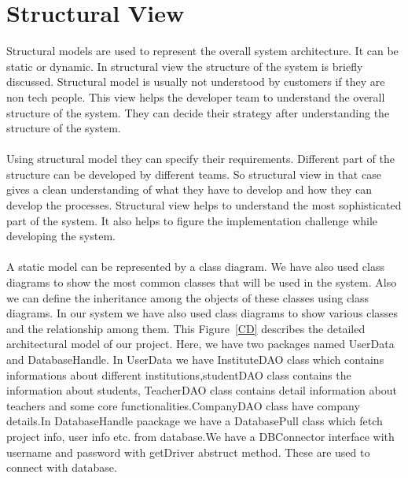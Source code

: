 \documentclass{scrreprt}
\begin{document}
\chapter{Structural View}
Structural models are used to represent the overall system architecture. It can be static or dynamic. In structural view the structure of the system is briefly discussed. Structural model is usually not understood by customers if they are non tech people. This view helps the developer team to understand the overall structure of the system. They can decide their strategy after understanding the structure of the system.\\\\ Using structural model they can specify their requirements. Different part of the structure can be developed by different teams. So structural view in that case gives a clean understanding of what they have to develop and how they can develop the processes. Structural view helps to understand the most sophisticated part of the system. It also helps to figure the implementation challenge while developing the system.\\\\A static model can be represented by a class diagram. We have also used class diagrams to show the most common classes that will be used in the system. Also we can define the inheritance among the objects of these classes using class diagrams. In our system we have also used class diagrams to show various classes and the relationship among them.
This Figure~\ref{CD} describes the detailed architectural model of our project. Here, we have two packages named UserData and DatabaseHandle. In UserData we have InstituteDAO class which contains informations about different institutions,studentDAO class contains the information about students, TeacherDAO class contains detail information about teachers and some core functionalities.CompanyDAO class have company details.In DatabaseHandle paackage we have a DatabasePull class which fetch project info, user info etc. from database.We have a DBConnector interface with username and password with getDriver abstruct method. These are used to connect with database. 
\end{document}
